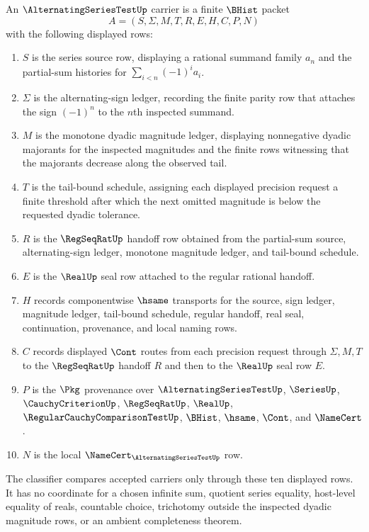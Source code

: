 \begin{definition}
\label{def:alternating-series-test-carrier}
An $\AlternatingSeriesTestUp$ carrier is a finite $\BHist$ packet
$$
A=(S,\Sigma,M,T,R,E,H,C,P,N)
$$
with the following displayed rows:
\begin{enumerate}
\item $S$ is the series source row, displaying a rational summand family $a_n$ and the partial-sum histories for $\sum_{i<n} (-1)^i a_i$.
\item $\Sigma$ is the alternating-sign ledger, recording the finite parity row that attaches the sign $(-1)^n$ to the $n$th inspected summand.
\item $M$ is the monotone dyadic magnitude ledger, displaying nonnegative dyadic majorants for the inspected magnitudes and the finite rows witnessing that the majorants decrease along the observed tail.
\item $T$ is the tail-bound schedule, assigning each displayed precision request a finite threshold after which the next omitted magnitude is below the requested dyadic tolerance.
\item $R$ is the $\RegSeqRatUp$ handoff row obtained from the partial-sum source, alternating-sign ledger, monotone magnitude ledger, and tail-bound schedule.
\item $E$ is the $\RealUp$ seal row attached to the regular rational handoff.
\item $H$ records componentwise $\hsame$ transports for the source, sign ledger, magnitude ledger, tail-bound schedule, regular handoff, real seal, continuation, provenance, and local naming rows.
\item $C$ records displayed $\Cont$ routes from each precision request through $\Sigma,M,T$ to the $\RegSeqRatUp$ handoff $R$ and then to the $\RealUp$ seal row $E$.
\item $P$ is the $\Pkg$ provenance over $\AlternatingSeriesTestUp$, $\SeriesUp$, $\CauchyCriterionUp$, $\RegSeqRatUp$, $\RealUp$, $\RegularCauchyComparisonTestUp$, $\BHist$, $\hsame$, $\Cont$, and $\NameCert$.
\item $N$ is the local $\NameCert_{\AlternatingSeriesTestUp}$ row.
\end{enumerate}
The classifier compares accepted carriers only through these ten displayed rows. It has no coordinate for a chosen infinite sum, quotient series equality, host-level equality of reals, countable choice, trichotomy outside the inspected dyadic magnitude rows, or an ambient completeness theorem.
\end{definition}

